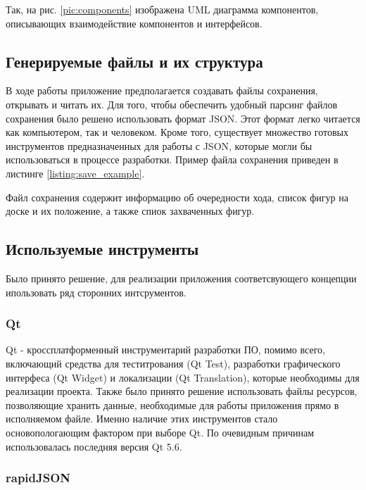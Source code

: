 Так, на рис. \ref{pic:components} изображена UML диаграмма компонентов, описывающих взаимодействие компонентов и интерфейсов.


\subsection{Генерируемые файлы и их структура}

В ходе работы приложение предполагается создавать файлы сохранения, открывать и читать их. Для того, чтобы обеспечить удобный парсинг файлов сохранения было решено использовать формат JSON. Этот формат легко читается как компьютером, так и человеком. Кроме того, существует множество готовых инструментов предназначенных для работы с JSON, которые могли бы использоваться в процессе разработки. Пример файла сохранения приведен в листинге \ref{listing:save_example}.

\label{listing:save_example} 

\parindent=0.6cm

 Файл сохранения содержит информацию об очередности хода, список фигур на доске и их положение, а также спиок захваченных фигур.

\subsection{Используемые инструменты}

Было принято решение, для реализации приложения соответсвующего концепции ипользовать ряд сторонних интсрументов. 

\subsubsection{Qt}

Qt - кроссплатформенный инструментарий разработки ПО, помимо всего, включающий средства для теститрования (Qt Test), разработки графического интерфеса (Qt Widget) и локализации (Qt Translation), которые необходимы для реализации проекта. Также было принято решение использовать файлы ресурсов, позволяющие хранить данные, необходимые для работы приложения прямо в исполняемом файле. Именно наличие этих инструментов стало основопологающим фактором при выборе Qt. По очевидным причинам использовалась последняя версия Qt 5.6.

\subsubsection{rapidJSON}

